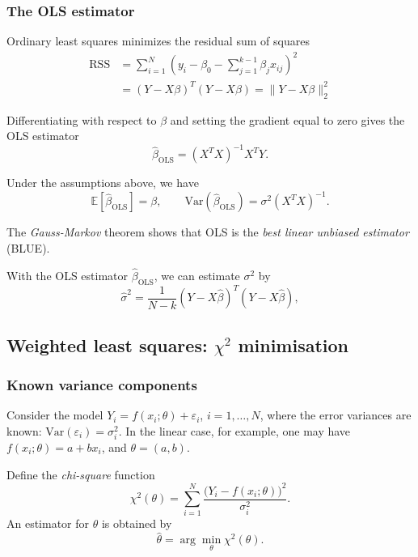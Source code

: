 \documentclass[11pt, titlepage]{article} %
\numberwithin{equation}{section}
\theoremstyle{definition}
\numberwithin{assumption}{section}
\begin{document}
\subsubsection*{The OLS estimator}

Ordinary least squares minimizes the residual sum of squares
\begin{align*}
    \mathrm{RSS}
    &=
    \sum_{i=1}^N
    \left(
    y_i-\beta_0-\sum_{j=1}^{k-1}\beta_j x_{ij}
    \right)^2\\
    &=
    (Y-X\beta)^T(Y-X\beta) =\|Y-X\beta\|_2^2
\end{align*}

Differentiating with respect to $\beta$ and setting the gradient equal to zero gives the OLS estimator
\begin{equation*}
    \hat\beta_{\mathrm{OLS}}=(X^TX)^{-1}X^TY.
\end{equation*}

Under the assumptions above, we have
\begin{equation*}
    \mathbb{E}[\hat\beta_{\mathrm{OLS}}]=\beta, \qquad \mathrm{Var}(\hat\beta_{\mathrm{OLS}})
    =
    \sigma^2(X^TX)^{-1}.
\end{equation*}

The \textit{Gauss-Markov} theorem shows that OLS is the \textit{best linear unbiased estimator} (BLUE).

With the OLS estimator $\hat \beta_{\mathrm{OLS}}$, we can estimate $\sigma^2$ by
\begin{equation*}
    \hat\sigma^2
    =
    \frac{1}{N-k}(Y-X\hat\beta)^T(Y-X\hat\beta),
\end{equation*}

\subsection{Weighted least squares: $\chi^2$ minimisation}

\subsubsection*{Known variance components}

Consider the model
$Y_i=f(x_i;\theta)+\varepsilon_i$, $i=1,\dots,N$, where the error variances are known:
$\mathrm{Var}(\varepsilon_i)=\sigma_i^2$.
In the linear case, for example, one may have $f(x_i;\theta)=a+bx_i$, and $\theta=(a,b)$.

Define the \textit{chi-square} function
\begin{equation*}
    \chi^2(\theta)
    =
    \sum_{i=1}^N \frac{\bigl(Y_i-f(x_i;\theta)\bigr)^2}{\sigma_i^2}.
\end{equation*}
An estimator for $\theta$ is obtained by
\begin{equation*}
    \hat{\theta}
    =
    \arg\min_\theta \chi^2(\theta).
\end{equation*}
\end{document}
